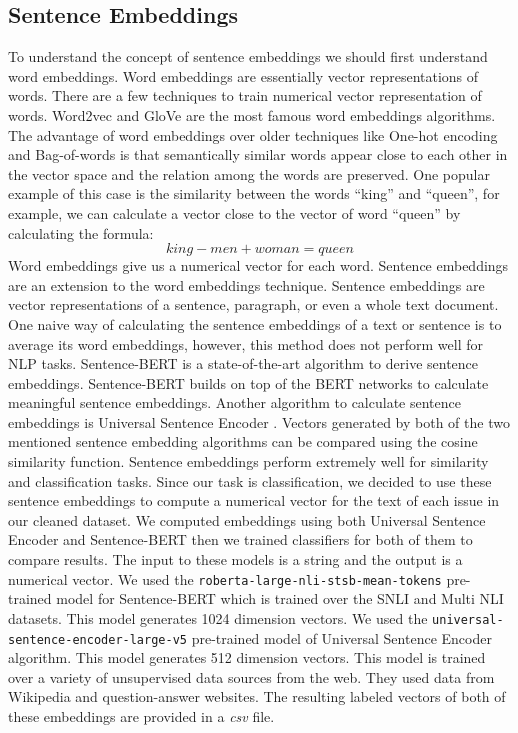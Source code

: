 \documentclass[conference]{IEEEtran}
\begin{document}
\subsection{Sentence Embeddings}
To understand the concept of sentence embeddings we should first understand word embeddings.
Word embeddings are essentially vector representations of words. There are a few techniques to train
numerical vector representation of words. Word2vec \cite{mikolov2013efficient,mikolov2013distributed} 
and GloVe \cite{pennington2014glove} are the most famous word embeddings algorithms. The advantage of
word embeddings over older techniques like One-hot encoding and Bag-of-words is that semantically similar
words appear close to each other in the vector space and the relation among the words are preserved.
One popular example of this case is the similarity between the words ``king'' and ``queen'', for example,
we can calculate a vector close to the vector of word ``queen'' by calculating the formula:
\begin{equation}
  king-men+woman=queen
\end{equation}
Word embeddings give us a numerical vector for each word. Sentence embeddings are an extension to 
the word embeddings technique. Sentence embeddings are vector representations of a sentence, paragraph, 
or even a whole text document. One naive way of calculating the sentence embeddings of a text or sentence 
is to average its word embeddings, however, this method does not perform well for NLP tasks. 
Sentence-BERT \cite{reimers-2019-sentence-bert} is a state-of-the-art 
algorithm to derive sentence embeddings. Sentence-BERT builds on top of the BERT \cite{devlin2019bert} networks 
to calculate meaningful sentence embeddings. Another algorithm to calculate sentence embeddings is 
Universal Sentence Encoder \cite{cer2018universal}. Vectors generated by both of the two mentioned sentence
embedding algorithms can be compared using the cosine similarity function. Sentence embeddings perform
extremely well for similarity and classification tasks. Since our task is classification, we decided to 
use these sentence embeddings to compute a numerical vector for the text of each issue in our 
cleaned dataset. We computed embeddings using both Universal Sentence Encoder and Sentence-BERT then we trained
classifiers for both of them to compare results. The input to these models is a string and the output is 
a numerical vector. We used the \verb|roberta-large-nli-stsb-mean-tokens| pre-trained 
model for Sentence-BERT which is trained over the SNLI \cite{snli:emnlp2015} and Multi NLI \cite{N18-1101} datasets. 
This model generates 1024 dimension vectors. We used the 
\verb|universal-sentence-encoder-large-v5| pre-trained model of Universal Sentence Encoder algorithm. This model generates 
512 dimension vectors. This model is trained over a variety of unsupervised data sources from the web. They used data
from Wikipedia and question-answer websites. The resulting labeled vectors of both of these embeddings 
are provided in a \textit{csv} file.
\end{document}
